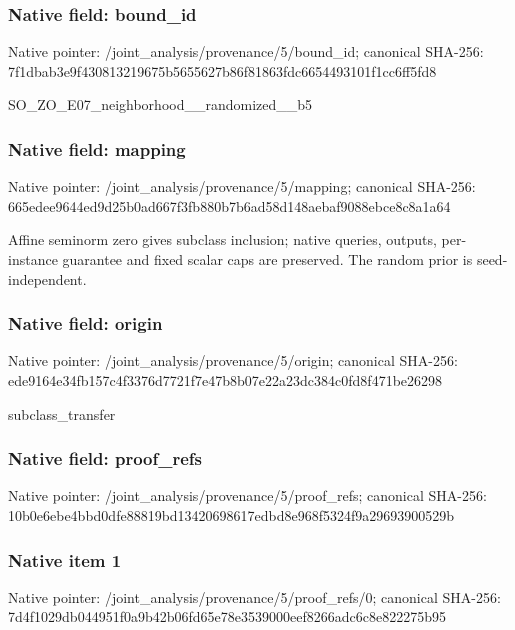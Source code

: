 \documentclass[10pt,a4paper]{article}
\begin{document}
\subsubsection{Native field: bound\_\allowbreak{}id}
Native pointer: /joint\_\allowbreak{}analysis/provenance/5/bound\_\allowbreak{}id; canonical SHA-256: 7f1dbab3e9f430813219675b5655627b86f81863fdc6654493101f1cc6ff5fd8

\begingroup\raggedright\sloppy SO\_\allowbreak{}ZO\_\allowbreak{}E07\_\allowbreak{}neighborhood\_\allowbreak{}\_\allowbreak{}randomized\_\allowbreak{}\_\allowbreak{}b5\par\endgroup

\subsubsection{Native field: mapping}
Native pointer: /joint\_\allowbreak{}analysis/provenance/5/mapping; canonical SHA-256: 665edee9644ed9d25b0ad667f3fb880b7b6ad58d148aebaf9088ebce8c8a1a64

\begingroup\raggedright\sloppy Affine seminorm zero gives subclass inclusion;\allowbreak{} native queries,\allowbreak{} outputs,\allowbreak{} per-instance guarantee and fixed scalar caps are preserved. The random prior is seed-independent.\par\endgroup

\subsubsection{Native field: origin}
Native pointer: /joint\_\allowbreak{}analysis/provenance/5/origin; canonical SHA-256: ede9164e34fb157c4f3376d7721f7e47b8b07e22a23dc384c0fd8f471be26298

\begingroup\raggedright\sloppy subclass\_\allowbreak{}transfer\par\endgroup

\subsubsection{Native field: proof\_\allowbreak{}refs}
Native pointer: /joint\_\allowbreak{}analysis/provenance/5/proof\_\allowbreak{}refs; canonical SHA-256: 10b0e6ebe4bbd0dfe88819bd13420698617edbd8e968f5324f9a29693900529b

\subsubsection{Native item 1}
Native pointer: /joint\_\allowbreak{}analysis/provenance/5/proof\_\allowbreak{}refs/0; canonical SHA-256: 7d4f1029db044951f0a9b42b06fd65e78e3539000eef8266adc6c8e822275b95
\end{document}
